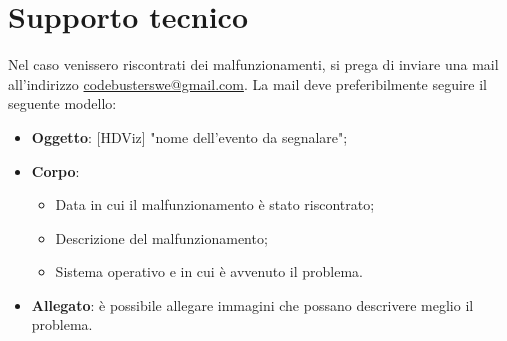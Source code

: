 \section{Supporto tecnico}
Nel caso venissero riscontrati dei malfunzionamenti, si prega di inviare una mail all'indirizzo \textcolor{blue}{\href{mailto:codebusterswe@gmail.com}{codebusterswe@gmail.com}}. La mail deve preferibilmente seguire il seguente modello:
\begin{itemize}
	\item \textbf{Oggetto}: [HDViz] "nome dell'evento da segnalare";
	\item \textbf{Corpo}: 
	\begin{itemize}
		\item Data in cui il malfunzionamento è stato riscontrato;
		\item Descrizione del malfunzionamento;
		\item Sistema operativo e  in cui è avvenuto il problema.
	\end{itemize}
	\item \textbf{Allegato}: è possibile allegare immagini che possano descrivere meglio il problema.
\end{itemize}